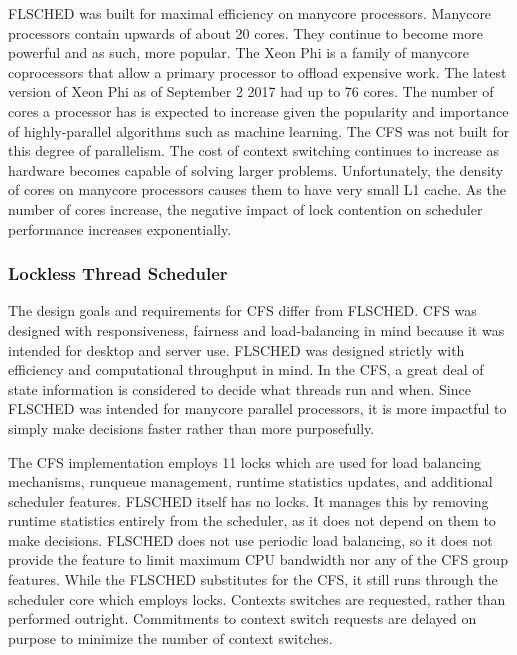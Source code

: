 \documentclass{sig-alternate}
\begin{document}
FLSCHED was built for maximal efficiency on manycore processors. Manycore processors contain upwards of about 20 cores. They continue to become more powerful and as such, more popular. The Xeon Phi is a family of manycore coprocessors that allow a primary processor to offload expensive work. The latest version of Xeon Phi as of September 2 2017 had up to 76 cores. The number of cores a processor has is expected to increase given the popularity and importance of highly-parallel algorithms such as machine learning. The CFS was not built for this degree of parallelism. The cost of context switching continues to increase as hardware becomes capable of solving larger problems. Unfortunately, the density of cores on manycore processors causes them to have very small L1 cache. As the number of cores increase, the negative impact of lock contention on scheduler performance increases exponentially.


\subsubsection{Lockless Thread Scheduler}
\label{sec:flsched_about}

The design goals and requirements for CFS differ from FLSCHED. CFS was designed with responsiveness, fairness and load-balancing in mind because it was intended for desktop and server use. FLSCHED was designed strictly with efficiency and computational throughput in mind. In the CFS, a great deal of state information is considered to decide what threads run and when. Since FLSCHED was intended for manycore parallel processors, it is more impactful to simply make decisions faster rather than more purposefully.~\cite{Jo:2017}

The CFS implementation employs 11 locks which are used for load balancing mechanisms, runqueue management, runtime statistics updates, and additional scheduler features. FLSCHED itself has no locks. It manages this by removing runtime statistics entirely from the scheduler, as it does not depend on them to make decisions. FLSCHED does not use periodic load balancing, so it does not provide the feature to limit maximum CPU bandwidth nor any of the CFS group features. While the FLSCHED substitutes for the CFS, it still runs through the scheduler core which employs locks. Contexts switches are requested, rather than performed outright. Commitments to context switch requests are delayed on purpose to minimize the number of context switches.~\cite{Jo:2017}
\end{document}
